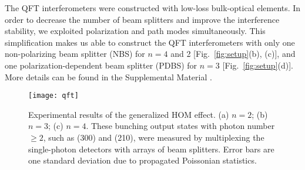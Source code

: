 \documentclass[aps,prl,twocolumn,superscriptaddress]{revtex4-1}
\begin{document}
The QFT interferometers were constructed with low-loss bulk-optical elements. In order to decrease the number of beam splitters and improve the interference stability, we exploited polarization and path modes simultaneously. This simplification makes us able to construct the QFT interferometers with only one non-polarizing beam splitter (NBS) for $n=4$ and 2 [Fig.~\ref{fig:setup}(b), (c)], and one polarization-dependent beam splitter (PDBS) for $n=3$ [Fig.~\ref{fig:setup}(d)]. More details can be found in the Supplemental Material \cite{SUPPLEMENTALMATERIAL}.


\begin{figure*}[t]
\texttt{[image: qft]}
\caption{\label{fig:qft} Experimental results of the generalized HOM effect. (a) $n=2$; (b) $n=3$; (c) $n=4$. These bunching output states with photon number $\ge 2$, such as (300) and (210), were measured by multiplexing the single-photon detectors with arrays of beam splitters. Error bars are one standard deviation due to propagated Poissonian statistics.}
\end{figure*}
\end{document}
